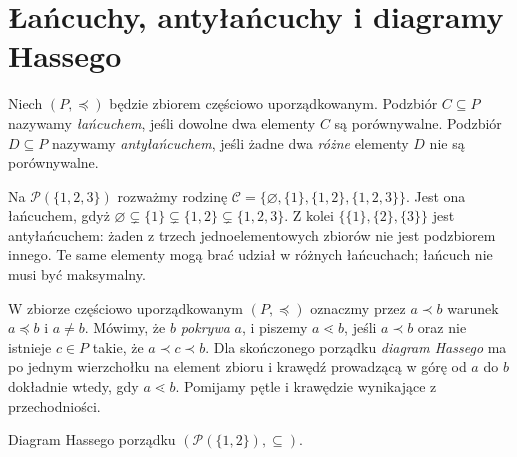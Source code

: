 \section{Łańcuchy, antyłańcuchy i diagramy Hassego}
\label{sec:order-hasse}
\begin{definicja}\label{def:chain-antichain}
Niech $(P,\preceq)$ będzie zbiorem częściowo uporządkowanym.
Podzbiór $C\subseteq P$ nazywamy \emph{łańcuchem}, jeśli
dowolne dwa elementy $C$ są porównywalne.
Podzbiór $D\subseteq P$ nazywamy \emph{antyłańcuchem}, jeśli
żadne dwa \emph{różne} elementy $D$ nie są porównywalne.
\end{definicja}

\begin{przyklad}
Na $\mathcal P(\{1,2,3\})$ rozważmy rodzinę
$\mathcal C=\{\varnothing,\{1\},\{1,2\},\{1,2,3\}\}$.
Jest ona łańcuchem, gdyż
$\varnothing\subsetneq\{1\}\subsetneq\{1,2\}\subsetneq\{1,2,3\}$.
Z kolei
$\{\{1\},\{2\},\{3\}\}$ jest antyłańcuchem:
żaden z trzech jednoelementowych zbiorów nie jest
podzbiorem innego. Te same elementy mogą brać udział
w różnych łańcuchach; łańcuch nie musi być maksymalny.
\end{przyklad}

\begin{definicja}
W zbiorze częściowo uporządkowanym $(P,\preceq)$ oznaczmy
przez $a\prec b$ warunek $a\preceq b$ i $a\ne b$.
Mówimy, że $b$ \emph{pokrywa} $a$, i piszemy $a\lessdot b$, jeśli
$a\prec b$ oraz nie istnieje $c\in P$ takie, że
$a\prec c\prec b$.
Dla skończonego porządku \emph{diagram Hassego} ma po
jednym wierzchołku na element zbioru i krawędź prowadzącą
w górę od $a$ do $b$ dokładnie wtedy, gdy $a\lessdot b$.
Pomijamy pętle i krawędzie wynikające z przechodniości.
\end{definicja}

\begin{center}

{\small Diagram Hassego porządku $(\mathcal P(\{1,2\}),\subseteq)$.}
\end{center}

